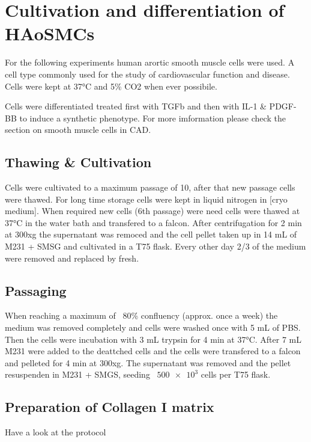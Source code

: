 \section{Cultivation and differentiation of HAoSMCs}
\label{sec:cultivation}
For the following experiments human arortic smooth muscle cells were used. A cell type commonly used for the study of cardiovascular function and disease. Cells were kept at 37°C and 5\% CO2 when ever possibile.

Cells were differentiated treated first with TGFb and then with IL-1 & PDGF-BB to induce a synthetic phenotype. For more imformation please check the section on smooth muscle cells in CAD.

    \subsection{Thawing \& Cultivation}
    Cells were cultivated to a maximum passage of 10, after that new passage cells were thawed. For long time storage cells were kept in liquid nitrogen in [cryo medium]. When required new cells (6th passage) were need cells were thawed at 37°C in the water bath and transfered to a falcon. After centrifugation for 2 min at 300xg the supernatant was remoced and the cell pellet taken up in 14 mL of M231 + SMSG and cultivated in a T75 flask. Every other day 2/3 of the medium were removed and replaced by fresh.

    \subsection{Passaging}
    When reaching a maximum of ~80\% confluency (approx. once a week) the medium was removed completely and cells were washed once with 5 mL of PBS. Then the cells were incubation with 3 mL trypsin for 4 min at 37°C. After 7 mL M231 were added to the deattched cells and the cells were transfered to a falcon and pelleted for 4 min at 300xg. The supernatant was removed and the pellet resuspenden in M231 + SMGS, seeding ~$\num{500e3}$ cells per T75 flask.

    \subsection{Preparation of Collagen I matrix}
    Have a look at the protocol

